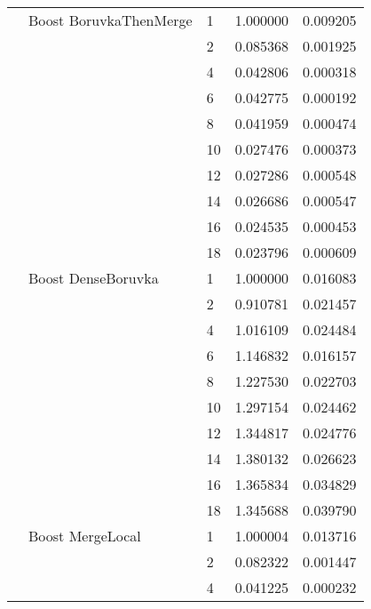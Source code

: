 \begin{tabular}{lllrr}
                      & Boost BoruvkaThenMerge & 1  &  1.000000 &  0.009205 \\
                      &                     & 2  &  0.085368 &  0.001925 \\
                      &                     & 4  &  0.042806 &  0.000318 \\
                      &                     & 6  &  0.042775 &  0.000192 \\
                      &                     & 8  &  0.041959 &  0.000474 \\
                      &                     & 10 &  0.027476 &  0.000373 \\
                      &                     & 12 &  0.027286 &  0.000548 \\
                      &                     & 14 &  0.026686 &  0.000547 \\
                      &                     & 16 &  0.024535 &  0.000453 \\
                      &                     & 18 &  0.023796 &  0.000609 \\
                      & Boost DenseBoruvka & 1  &  1.000000 &  0.016083 \\
                      &                     & 2  &  0.910781 &  0.021457 \\
                      &                     & 4  &  1.016109 &  0.024484 \\
                      &                     & 6  &  1.146832 &  0.016157 \\
                      &                     & 8  &  1.227530 &  0.022703 \\
                      &                     & 10 &  1.297154 &  0.024462 \\
                      &                     & 12 &  1.344817 &  0.024776 \\
                      &                     & 14 &  1.380132 &  0.026623 \\
                      &                     & 16 &  1.365834 &  0.034829 \\
                      &                     & 18 &  1.345688 &  0.039790 \\
                      & Boost MergeLocal & 1  &  1.000004 &  0.013716 \\
                      &                     & 2  &  0.082322 &  0.001447 \\
                      &                     & 4  &  0.041225 &  0.000232 \\

\end{tabular}

